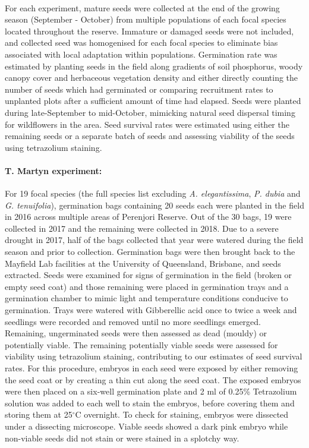\begin{refsection}
        \paragraph{}
        For each experiment, mature seeds were collected at the end of the growing season (September - October) from multiple populations of each focal species located throughout the reserve. Immature or damaged seeds were not included, and collected seed was homogenised for each focal species to eliminate bias associated with local adaptation within populations. Germination rate was estimated by planting seeds in the field along gradients of soil phosphorus, woody canopy cover and herbaceous vegetation density and either directly counting the number of seeds which had germinated or comparing recruitment rates to unplanted plots after a sufficient amount of time had elapsed. Seeds were planted during late-September to mid-October, mimicking natural seed dispersal timing for wildflowers in the area. Seed survival rates were estimated using either the remaining seeds or a separate batch of seeds and assessing viability of the seeds using tetrazolium staining. 


        \paragraph{T. Martyn experiment:}
        For 19 focal species (the full species list excluding \textit{A. elegantissima}, \textit{P. dubia} and \textit{G. tenuifolia}), germination bags containing 20 seeds each were planted in the field in 2016 across multiple areas of Perenjori Reserve. Out of the 30 bags, 19 were collected in 2017 and the remaining were collected in 2018. Due to a severe drought in 2017, half of the bags collected that year were watered during the field season and prior to collection. Germination bags were then brought back to the Mayfield Lab facilities at the University of Queensland, Brisbane, and seeds extracted. Seeds were examined for signs of germination in the field (broken or empty seed coat) and those remaining were placed in germination trays and a germination chamber to mimic light and temperature conditions conducive to germination. Trays were watered with Gibberellic acid once to twice a week and seedlings were recorded and removed until no more seedlings emerged. Remaining, ungerminated seeds were then assessed as dead (mouldy) or potentially viable. The remaining potentially viable seeds were assessed for viability using tetrazolium staining, contributing to our estimates of seed survival rates. For this procedure, embryos in each seed were exposed by either removing the seed coat or by creating a thin cut along the seed coat. The exposed embryos were then placed on a six-well germination plate and 2 ml of 0.25\% Tetrazolium solution was added to each well to stain the embryos, before covering them and storing them at 25$^{\circ}$C overnight. To check for staining, embryos were dissected under a dissecting microscope. Viable seeds showed a dark pink embryo while non-viable seeds did not stain or were stained in a splotchy way.



\end{refsection}
